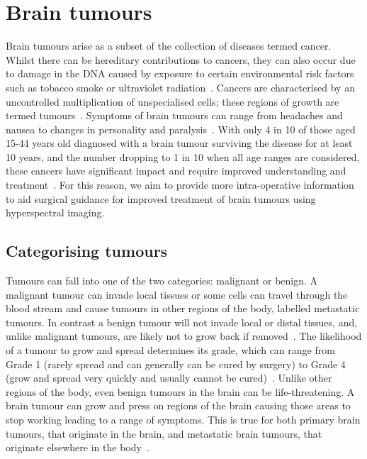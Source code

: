 \section{Brain tumours}\label{sec:braintumours}
Brain tumours arise as a subset of the collection of diseases termed cancer. Whilst there can be hereditary contributions to cancers, they can also occur due to damage in the DNA caused by exposure to certain environmental risk factors such as tobacco smoke or ultraviolet radiation~\cite{WorldHealthOrganisation2023}. Cancers are characterised by an uncontrolled multiplication of unspecialised cells; these regions of growth are termed tumours~\cite{WorldHealthOrganisation2023}. Symptoms of brain tumours can range from headaches and nausea to changes in personality and paralysis~\cite{NationalHealthService2023}. With only 4 in 10 of those aged 15-44 years old diagnosed with a brain tumour surviving the disease for at least 10 years, and the number dropping to 1 in 10 when all age ranges are considered, these cancers have significant impact and require improved understanding and treatment~\cite{CancerResearchUK2023}. For this reason, we aim to provide more intra-operative information to aid surgical guidance for improved treatment of brain tumours using hyperspectral imaging. 

\subsection{Categorising tumours} 
Tumours can fall into one of the two categories: malignant or benign. A malignant tumour can invade local tissues or some cells can travel through the blood stream and cause tumours in other regions of the body, labelled metastatic tumours. In contrast a benign tumour will not invade local or distal tissues, and, unlike malignant tumours, are likely not to grow back if removed~\cite{Institute2021}. The likelihood of a tumour to grow and spread determines its grade, which can range from Grade 1 (rarely spread and can generally can be cured by surgery) to Grade 4 (grow and spread very quickly and usually cannot be cured)~\cite{Institute2023}. Unlike other regions of the body, even benign tumours in the brain can be life-threatening. A brain tumour can grow and press on regions of the brain causing those areas to stop working leading to a range of symptoms. This is true for both primary brain tumours, that originate in the brain, and metastatic brain tumours, that originate elsewhere in the body~\cite{Institute2021}.


